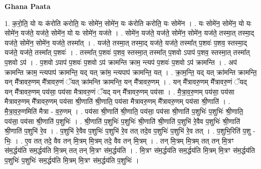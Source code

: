 \documentclass[17pt]{extarticle}
\begin{document}
\textbf{Ghana Paata } \newline

1. क॒रो॒ति॒ यो यः क॑रोति करोति॒ यः सोमे॑न॒ सोमे॑न॒ यः क॑रोति करोति॒ यः सोमे॑न । . यः सोमे॑न॒ सोमे॑न॒ यो यः सोमे॑न॒ यज॑ते॒ यज॑ते॒ सोमे॑न॒ यो यः सोमे॑न॒ यज॑ते । . सोमे॑न॒ यज॑ते॒ यज॑ते॒ सोमे॑न॒ सोमे॑न॒ यज॑ते॒ तस्मा॒त् तस्मा॒द् यज॑ते॒ सोमे॑न॒ सोमे॑न॒ यज॑ते॒ तस्मा᳚त् । . यज॑ते॒ तस्मा॒त् तस्मा॒द् यज॑ते॒ यज॑ते॒ तस्मा᳚त् प॒शवः॑ प॒शव॒ स्तस्मा॒द् यज॑ते॒ यज॑ते॒ तस्मा᳚त् प॒शवः॑ । . तस्मा᳚त् प॒शवः॑ प॒शव॒ स्तस्मा॒त् तस्मा᳚त् प॒शवो ऽपाप॑ प॒शव॒ स्तस्मा॒त् तस्मा᳚त् प॒शवो ऽप॑ । . प॒शवो ऽपाप॑ प॒शवः॑ प॒शवो ऽप॑ क्रामन्ति क्राम॒ न्त्यप॑ प॒शवः॑ प॒शवो ऽप॑ क्रामन्ति । . अप॑ क्रामन्ति क्राम॒ न्त्यपाप॑ क्रामन्ति॒ यद् यत् क्रा॑म॒ न्त्यपाप॑ क्रामन्ति॒ यत् । . क्रा॒म॒न्ति॒ यद् यत् क्रा॑मन्ति क्रामन्ति॒ यन् मै᳚त्रावरु॒णम् मै᳚त्रावरु॒णं ॅयत् क्रा॑मन्ति क्रामन्ति॒ यन् मै᳚त्रावरु॒णम् । . यन् मै᳚त्रावरु॒णम् मै᳚त्रावरु॒णं ॅयद् यन् मै᳚त्रावरु॒णम् पय॑सा॒ पय॑सा मैत्रावरु॒णं ॅयद् यन् मै᳚त्रावरु॒णम् पय॑सा । . मै॒त्रा॒व॒रु॒णम् पय॑सा॒ पय॑सा मैत्रावरु॒णम् मै᳚त्रावरु॒णम् पय॑सा श्री॒णाति॑ श्री॒णाति॒ पय॑सा मैत्रावरु॒णम् मै᳚त्रावरु॒णम् पय॑सा श्री॒णाति॑ । . मै॒त्रा॒व॒रु॒णमिति॑ मैत्रा - व॒रु॒णम् । . पय॑सा श्री॒णाति॑ श्री॒णाति॒ पय॑सा॒ पय॑सा श्री॒णाति॑ प॒शुभिः॑ प॒शुभिः॑ श्री॒णाति॒ पय॑सा॒ पय॑सा श्री॒णाति॑ प॒शुभिः॑ । . श्री॒णाति॑ प॒शुभिः॑ प॒शुभिः॑ श्री॒णाति॑ श्री॒णाति॑ प॒शुभि॑ रे॒वैव प॒शुभिः॑ श्री॒णाति॑ श्री॒णाति॑ प॒शुभि॑ रे॒व । . प॒शुभि॑ रे॒वैव प॒शुभिः॑ प॒शुभि॑ रे॒व तत् तदे॒व प॒शुभिः॑ प॒शुभि॑ रे॒व तत् । . प॒शुभि॒रिति॑ प॒शु - भिः॒ । . ए॒व तत् तदे॒ वैव तन् मि॒त्रम् मि॒त्रम् तदे॒ वैव तन् मि॒त्रम् । . तन् मि॒त्रम् मि॒त्रम् तत् तन् मि॒त्रꣳ स॑म॒र्द्धय॑ति सम॒र्द्धय॑ति मि॒त्रम् तत् तन् मि॒त्रꣳ स॑म॒र्द्धय॑ति । . मि॒त्रꣳ स॑म॒र्द्धय॑ति सम॒र्द्धय॑ति मि॒त्रम् मि॒त्रꣳ स॑म॒र्द्धय॑ति प॒शुभिः॑ प॒शुभिः॑ सम॒र्द्धय॑ति मि॒त्रम् मि॒त्रꣳ स॑म॒र्द्धय॑ति प॒शुभिः॑ । \newline
\end{document}
